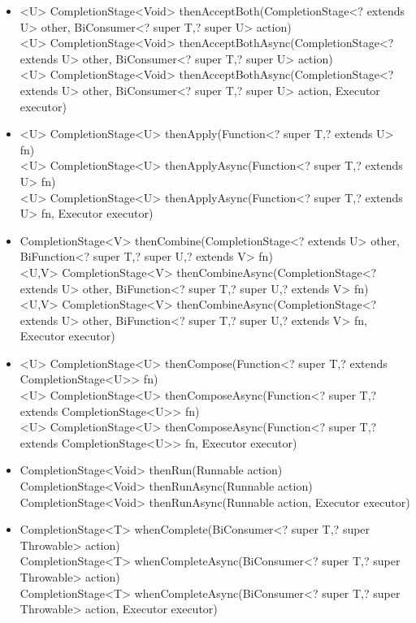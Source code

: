 \documentclass[]{usiinfthesis}
\begin{document}
{\begin{itemize}
    \mbox{}\\ CompletionStage<Void> thenAcceptAsync(Consumer<? super T> action, Executor executor)
    \item   <U> CompletionStage<Void> thenAcceptBoth(CompletionStage<? extends U> other, BiConsumer<? super T,? super U> action)
    \mbox{}\\ <U> CompletionStage<Void> thenAcceptBothAsync(CompletionStage<? extends U> other, BiConsumer<? super T,? super U> action)
    \mbox{}\\ <U> CompletionStage<Void> thenAcceptBothAsync(CompletionStage<? extends U> other, BiConsumer<? super T,? super U> action, Executor executor)
    \item   <U> CompletionStage<U> thenApply(Function<? super T,? extends U> fn)
    \mbox{}\\ <U> CompletionStage<U> thenApplyAsync(Function<? super T,? extends U> fn)
    \mbox{}\\ <U> CompletionStage<U> thenApplyAsync(Function<? super T,? extends U> fn, Executor executor)
    \item   <U,V> CompletionStage<V> thenCombine(CompletionStage<? extends U> other, BiFunction<? super T,? super U,? extends V> fn)
    \mbox{}\\ <U,V> CompletionStage<V> thenCombineAsync(CompletionStage<? extends U> other, BiFunction<? super T,? super U,? extends V> fn)
    \mbox{}\\ <U,V> CompletionStage<V> thenCombineAsync(CompletionStage<? extends U> other, BiFunction<? super T,? super U,? extends V> fn, Executor executor)
    \item   <U> CompletionStage<U> thenCompose(Function<? super T,? extends CompletionStage<U>> fn)
    \mbox{}\\ <U> CompletionStage<U> thenComposeAsync(Function<? super T,? extends CompletionStage<U>> fn)
    \mbox{}\\ <U> CompletionStage<U> thenComposeAsync(Function<? super T,? extends CompletionStage<U>> fn, Executor executor)
    \item   CompletionStage<Void> thenRun(Runnable action)
    \mbox{}\\ CompletionStage<Void> thenRunAsync(Runnable action)
    \mbox{}\\ CompletionStage<Void> thenRunAsync(Runnable action, Executor executor)
    \item   CompletionStage<T> whenComplete(BiConsumer<? super T,? super Throwable> action)
    \mbox{}\\ CompletionStage<T> whenCompleteAsync(BiConsumer<? super T,? super Throwable> action)
    \mbox{}\\ CompletionStage<T> whenCompleteAsync(BiConsumer<? super T,? super Throwable> action, Executor executor)
\end{itemize}

}
\end{document}
